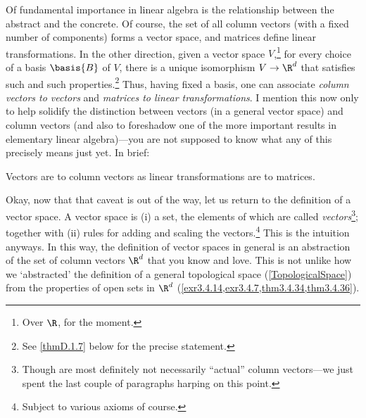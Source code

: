Of fundamental importance in linear algebra is the relationship between the abstract and the concrete.  Of course, the set of all column vectors (with a fixed number of components) forms a vector space, and matrices define linear transformations.  In the other direction, given a vector space $V$,\footnote{Over $\R$, for the moment.} for every choice of a basis $\basis{B}$ of $V$, there is a unique isomorphism $V\rightarrow \R ^d$ that satisfies such and such properties.\footnote{See \cref{thmD.1.7} below for the precise statement.}  Thus, having fixed a basis, one can associate \emph{column vectors to vectors} and \emph{matrices to linear transformations}.  I mention this now only to help solidify the distinction between vectors (in a general vector space) and column vectors (and also to foreshadow one of the more important results in elementary linear algebra)---you are not supposed to know what any of this precisely means just yet.  In brief:
\begin{important}
Vectors are to column vectors as linear transformations are to matrices.
\end{important}

Okay, now that that caveat is out of the way, let us return to the definition of a vector space.  A vector space is (i) a set, the elements of which are called \emph{vectors}\footnote{Though are most definitely not necessarily ``actual'' column vectors---we just spent the last couple of paragraphs harping on this point.}; together with (ii) rules for adding and scaling the vectors.\footnote{Subject to various axioms of course.}  This is the intuition anyways.  In this way, the definition of vector spaces in general is an abstraction of the set of column vectors $\R ^d$ that you know and love.  This is not unlike how we `abstracted' the definition of a general topological space (\cref{TopologicalSpace}) from the properties of open sets in $\R ^d$ (\cref{exr3.4.14,exr3.4.7,thm3.4.34,thm3.4.36}).

